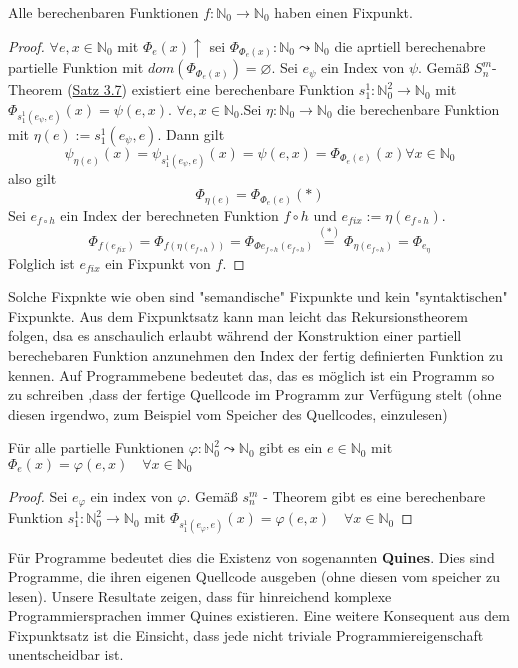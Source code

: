    Alle berechenbaren Funktionen $f : \mathbb{N}_0 \to \mathbb{N}_0$ haben einen Fixpunkt.
  \begin{proof}
    $\forall e, x \in \mathbb{N}_0$ mit $\Phi_e(x) \uparrow$ sei $\Phi_{\Phi_e(x)} : \mathbb{N}_0 \leadsto \mathbb{N}_0$ die aprtiell berechenabre partielle Funktion mit $dom(\Phi_{\Phi_e(x)}) = \varnothing$. Sei $e_{\psi}$ ein Index von $\psi$. Gemäß $S_n^m$-Theorem (\hyperref[subsec:3.16]{Satz 3.7}) existiert eine berechenbare Funktion $s_1^1 : \mathbb{N}_0^2 \to \mathbb{N}_0$ mit $\Phi_{s_1^1(e_{\psi}, e)}(x) = \psi(e, x)$. $\forall e, x \in \mathbb{N}_0$.Sei $\eta : \mathbb{N}_0 \to \mathbb{N}_0$ die berechenbare Funktion mit $\eta (e) := s_1^1(e_{\psi}, e)$. Dann gilt \[\psi_{\eta(e)}(x) = \psi_{s_1^1(e_{\psi}, e)}(x) = \psi(e, x) = \Phi_{\Phi_e(e)}(x) \forall x \in \mathbb{N}_0\] also gilt \[\Phi_{\eta(e)} = \Phi_{\Phi_e (e)} (*)\] Sei $e_{f \circ h}$ ein Index der berechneten Funktion $f \circ h$ und $e_{fix} := \eta(e_{f\circ h})$. \[ \Phi_{f(e_{fix})} = \Phi_{f(\eta(e_{f \circ h}))} = \Phi_{\Phi{e_{f\circ h}} (e_{f\circ h})} \overset{(*)}{=} \Phi_{\eta(e_{f \circ h})} = \Phi_{e_\eta}\] Folglich ist $e_{fix}$ ein Fixpunkt von $f$. 
  \end{proof}
  Solche Fixpnkte wie oben sind "semandische" Fixpunkte und kein "syntaktischen" Fixpunkte. Aus dem Fixpunktsatz kann man leicht das Rekursionstheorem folgen, dsa es anschaulich erlaubt während der Konstruktion einer partiell berechebaren Funktion anzunehmen den Index der fertig definierten Funktion zu kennen. Auf Programmebene bedeutet das, das es möglich ist ein Programm so zu schreiben ,dass der fertige Quellcode im Programm zur Verfügung stelt (ohne diesen irgendwo, zum Beispiel vom Speicher des Quellcodes, einzulesen)

  Für alle partielle Funktionen $\varphi : \mathbb{N}_0^2 \leadsto \mathbb{N}_0$ gibt es ein $e \in \mathbb{N}_0$ mit $\Phi_e(x) = \varphi(e, x) \quad \forall x \in \mathbb{N}_0$ 

  \begin{proof}
    Sei $e_{\varphi}$ ein index von $\varphi$. Gemäß $s_n^m$ - Theorem gibt es eine berechenbare Funktion $s_1^1 : \mathbb{N}_0^2 \to \mathbb{N}_0$ mit $\Phi_{s^1_1 (e_{\varphi}, e)} (x) = \varphi (e, x) \quad \forall x \in \mathbb{N}_0$
  \end{proof}

  Für Programme bedeutet dies die Existenz von sogenannten \textbf{Quines}. Dies sind Programme, die ihren eigenen Quellcode ausgeben (ohne diesen vom speicher zu lesen). Unsere Resultate zeigen, dass für hinreichend komplexe Programmiersprachen immer Quines existieren. Eine weitere Konsequent aus dem Fixpunktsatz ist die Einsicht, dass jede nicht triviale Programmiereigenschaft unentscheidbar ist.

